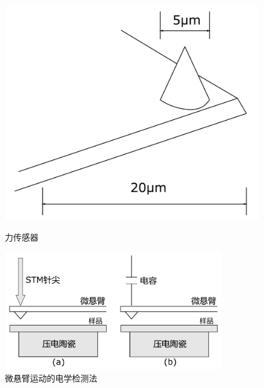 \documentclass[a4paper]{article}
\begin{document}
\begin{figure}[H]
\begin{minipage}{0.29\textwidth}
\begin{center}
\includegraphics[width=1.2\textwidth]{fig/fig1.pdf}
\caption{力传感器}\label{fig1}
\end{center}
\end{minipage}
\begin{minipage}{0.69\textwidth}
\begin{center}
\includegraphics[width=0.85\textwidth]{fig/fig2.pdf}
\caption{微悬臂运动的电学检测法}\label{fig2}
\end{center}
\end{minipage}
\end{figure}
\end{document}
